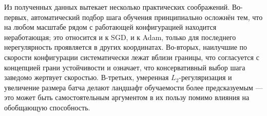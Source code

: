 Из полученных данных вытекает несколько практических соображений.
Во-первых, автоматический подбор шага обучения принципиально осложнён тем, что
на любом масштабе рядом с работающей конфигурацией находится неработающая;
это относится и к SGD, и к Adam, только для последнего нерегулярность
проявляется в других координатах. Во-вторых, наилучшие по скорости
конфигурации систематически лежат вблизи границы, что согласуется с концепцией
грани устойчивости и означает, что консервативный выбор шага заведомо жертвует
скоростью. В-третьих, умеренная $L_2$-регуляризация и увеличение размера батча
делают ландшафт обучаемости более предсказуемым --- это может быть
самостоятельным аргументом в их пользу помимо влияния на обобщающую
способность.
